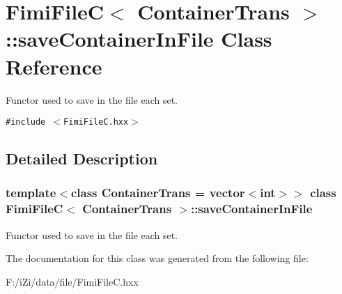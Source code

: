 \section{Fimi\-File\-C$<$ Container\-Trans $>$::save\-Container\-In\-File Class Reference}
\label{class_fimi_file_c_1_1save_container_in_file}
Functor used to save in the file each set.  


{\tt \#include $<$Fimi\-File\-C.hxx$>$}



\subsection{Detailed Description}
\subsubsection*{template$<$class Container\-Trans = vector$<$int$>$$>$ class Fimi\-File\-C$<$ Container\-Trans $>$::save\-Container\-In\-File}

Functor used to save in the file each set. 



The documentation for this class was generated from the following file:\begin{CompactItemize}
\item 
F:/i\-Zi/data/file/Fimi\-File\-C.hxx\end{CompactItemize}
